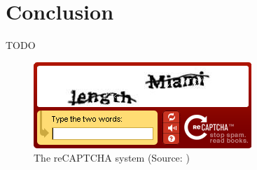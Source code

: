 \documentclass[pdftex,a4paper,12pt,twoside]{report}
\begin{document}
\chapter{Conclusion}
\label{ch:conclusie}
TODO
%
%
\appendix
%
%
%


%
%
\listoffigures
\begin{figure}
	\centering
	\includegraphics[width=\textwidth]{./img/reCAPTCHA.png}
	\caption{The reCAPTCHA system (Source: \citep{UNDP2013})}
	\label{fig:reCAPTCHA}
\end{figure}
\end{document}
